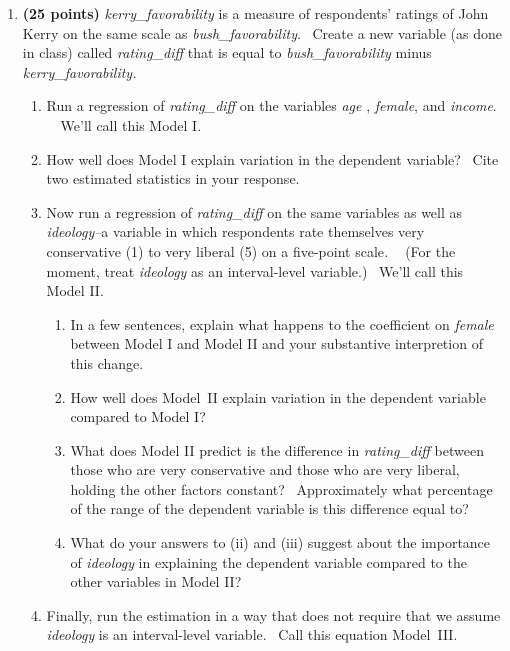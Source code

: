 \documentclass[11pt]{article}
\begin{document}
\begin{enumerate}
\item \textbf{(25 points) }\textit{kerry\_favorability }is a measure of
respondents' ratings of John Kerry on the same scale as \textit{%
bush\_favorability}. \ Create a new variable (as done in class) called 
\textit{rating\_diff }that is equal to \textit{bush\_favorability }minus 
\textit{kerry\_favorability.} \ \ 

\begin{enumerate}
\item Run a regression of \textit{rating\_diff }on the variables \textit{age}%
, \textit{female}, and \textit{income}. \ \ We'll call this Model I.

\item How well does Model I explain variation in the dependent variable? \
Cite two estimated statistics in your response.

\item Now run a regression of \textit{rating\_diff }on the same variables as
well as \textit{ideology--}a variable in which respondents rate themselves
very conservative (1) to very liberal (5) on a five-point scale\textit{. \ }%
(For the moment, treat \textit{ideology} as an interval-level variable.) \
We'll call this Model II.

\begin{enumerate}
\item In a few sentences, explain what happens to the coefficient on \textit{%
female }between Model I and Model II and your substantive interpretion of
this change. \ 

\item How well does Model\ II explain variation in the dependent variable
compared to Model I? \ 

\item What does Model II predict is the difference in \textit{rating\_diff }%
between those who are very conservative and those who are very liberal,
holding the other factors constant? \ Approximately what percentage of the
range of the dependent variable is this difference equal to?

\item What do your answers to (ii) and (iii) suggest about the importance of 
\textit{ideology }in explaining the dependent variable compared to the other
variables in Model II?
\end{enumerate}

\item Finally, run the estimation in a way that does not require that we
assume \textit{ideology }is an interval-level variable. \ Call this equation
Model\ III.


\end{enumerate}
\end{enumerate}
\end{document}
